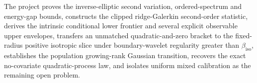 The project proves the inverse-elliptic second variation, ordered-spectrum and energy-gap bounds, constructs the clipped ridge-Galerkin second-order statistic, derives the intrinsic conditional lower frontier and several explicit observable upper envelopes, transfers an unmatched quadratic-and-zero bracket to the fixed-radius positive isotropic slice under boundary-wavelet regularity greater than \(\beta_{\mathrm{iso}}\), establishes the population growing-rank Gaussian transition, recovers the exact no-covariate quadratic-process law, and isolates uniform mixed calibration as the remaining open problem.